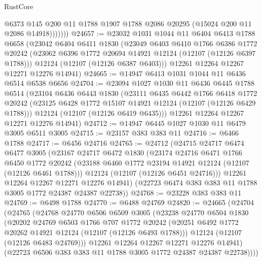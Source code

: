 \begin{lexlean}{RustCore}
\begin{coremodule}
                @6373
                @145
                @200
                @11
                @1788
                @1907
                @1788
                @2086
                @20295
                (@15024 @200 @11 @2086 @14918)))))))
@24657 := @23032
    @1031
    @1044
    @11
    @6404
    @6413
    @1788
    @6658
    (@23042
      @6404
      @6411
      @1830
      (@23049
        @6403
        @6410
        @1766
        @6386
        @1772
        @20242
        (@23062 @6396 @1772 @20694 @14921 @12124 (@12107 (@12126 @6397 @1788)))
        @12124
        (@12107 (@12126 @6387 @6403)))
      @12261
      @12264
      @12267
      @12271
      @12276
      @14941)
@24665 := @14947 @6413 @1031 @1044 @11 @6436 @6514 @6538 @6656
@24704 := @23094
    @1027
    @1030
    @11
    @6436
    @6445
    @1788
    @6514
    (@23104
      @6436
      @6443
      @1830
      (@23111
        @6435
        @6442
        @1766
        @6418
        @1772
        @20242
        (@23125 @6428 @1772 @15107 @14921 @12124 (@12107 (@12126 @6429 @1788)))
        @12124
        (@12107 (@12126 @6419 @6435)))
      @12261
      @12264
      @12267
      @12271
      @12276
      @14941)
@24712 := @14947 @6445 @1027 @1030 @11 @6479 @3005 @6511 @3005
@24715 := @23157 @383 @383 @11
@24716 := @6466 @1788
@24717 := @6456 @24716
@24765 := @24712
    (@24715
      @24717
      @6474
      @6477
      @3005
      (@23167
        @24717
        @6472
        @1830
        (@23174
          @24716
          @6471
          @1766
          @6450
          @1772
          @20242
          (@23188 @6460 @1772 @23194 @14921 @12124 (@12107 (@12126 @6461 @1788)))
          @12124
          (@12107 (@12126 @6451 @24716)))
        @12261
        @12264
        @12267
        @12271
        @12276
        @14941)
      (@22723 @6474 @383 @383 @11 @1788 @3005 @1772 @24387 @24387 @22738))
@24768 := @23228 @383 @383 @11
@24769 := @6498 @1788
@24770 := @6488 @24769
@24820 := @24665
    (@24704
      (@24765
        (@24768
          @24770
          @6506
          @6509
          @3005
          (@23238
            @24770
            @6504
            @1830
            (@20202
              @24769
              @6503
              @1766
              @707
              @1772
              @20242
              (@20251 @6492 @1772 @20262 @14921 @12124 (@12107 (@12126 @6493 @1788)))
              @12124
              (@12107 (@12126 @6483 @24769)))
            @12261
            @12264
            @12267
            @12271
            @12276
            @14941)
          (@22723 @6506 @383 @383 @11 @1788 @3005 @1772 @24387 @24387 @22738))))

\end{coremodule}
\end{lexlean}
